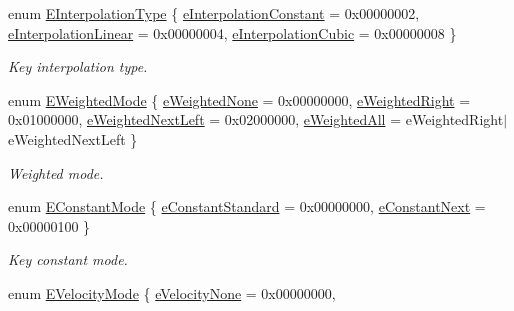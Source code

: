 \begin{DoxyCompactItemize}
\item 
enum \hyperlink{class_fbx_anim_curve_def_add2ab7d10d856ab0868cc9b143d59ea5}{E\+Interpolation\+Type} \{ \hyperlink{class_fbx_anim_curve_def_add2ab7d10d856ab0868cc9b143d59ea5acb7611d721a1ae1e6df7a2f072dc7c9f}{e\+Interpolation\+Constant} = 0x00000002, 
\hyperlink{class_fbx_anim_curve_def_add2ab7d10d856ab0868cc9b143d59ea5ab60e201b78e2105be1134c3c15519d20}{e\+Interpolation\+Linear} = 0x00000004, 
\hyperlink{class_fbx_anim_curve_def_add2ab7d10d856ab0868cc9b143d59ea5a16ef50fcdbb8ae99246f06e12f9d3dae}{e\+Interpolation\+Cubic} = 0x00000008
 \}\begin{DoxyCompactList}\small\item\em Key interpolation type. \end{DoxyCompactList}
\item 
enum \hyperlink{class_fbx_anim_curve_def_aeee6e9cc12501e10dbd3e5caaf66990e}{E\+Weighted\+Mode} \{ \hyperlink{class_fbx_anim_curve_def_aeee6e9cc12501e10dbd3e5caaf66990ea2ae55a3ceae7773d899ebfae26dcbef3}{e\+Weighted\+None} = 0x00000000, 
\hyperlink{class_fbx_anim_curve_def_aeee6e9cc12501e10dbd3e5caaf66990ea869960737022db21fc64480daa22725a}{e\+Weighted\+Right} = 0x01000000, 
\hyperlink{class_fbx_anim_curve_def_aeee6e9cc12501e10dbd3e5caaf66990eae28d75f955feebe5756d77ad0765d000}{e\+Weighted\+Next\+Left} = 0x02000000, 
\hyperlink{class_fbx_anim_curve_def_aeee6e9cc12501e10dbd3e5caaf66990ea4337e6853fab642c2a432ab1bb303922}{e\+Weighted\+All} = e\+Weighted\+Right$\vert$e\+Weighted\+Next\+Left
 \}\begin{DoxyCompactList}\small\item\em Weighted mode. \end{DoxyCompactList}
\item 
enum \hyperlink{class_fbx_anim_curve_def_a52885abd392ac8ac3da94bafc5fddd64}{E\+Constant\+Mode} \{ \hyperlink{class_fbx_anim_curve_def_a52885abd392ac8ac3da94bafc5fddd64afa9ab4c869fe6eb4589e1298375ac66f}{e\+Constant\+Standard} = 0x00000000, 
\hyperlink{class_fbx_anim_curve_def_a52885abd392ac8ac3da94bafc5fddd64acd33e33b487685436e39688ca986f2d6}{e\+Constant\+Next} = 0x00000100
 \}\begin{DoxyCompactList}\small\item\em Key constant mode. \end{DoxyCompactList}
\item 
enum \hyperlink{class_fbx_anim_curve_def_a747576beffa78ab236d2e140da395fff}{E\+Velocity\+Mode} \{ \hyperlink{class_fbx_anim_curve_def_a747576beffa78ab236d2e140da395fffa7919a5bf6ff7855e3b60673ade08afbc}{e\+Velocity\+None} = 0x00000000, 

\end{DoxyCompactItemize}
